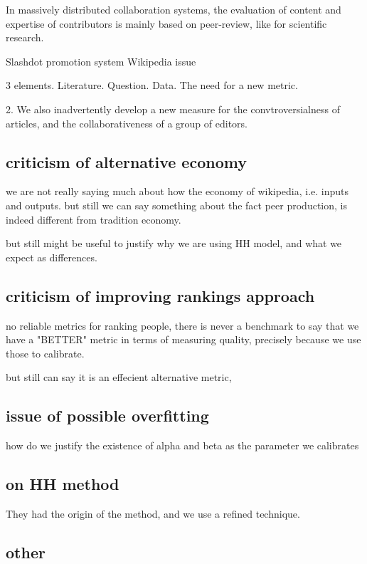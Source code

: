 \documentclass{acm_proc_article-sp}
\begin{document}
In massively distributed collaboration systems, the evaluation of content and expertise of contributors is mainly based on peer-review, like for scientific research.

Slashdot promotion system \cite{}
Wikipedia issue \cite{halfaker2013}



3 elements. Literature. Question. Data. The need for a new metric.

2. We also inadvertently develop a new measure for the convtroversialness of articles, and the collaborativeness of a group of editors.

\subsection{criticism of alternative economy}
we are not really saying much about how the economy of wikipedia, i.e. inputs and outputs.
but still we can say something about the fact peer production, is indeed different from tradition economy.

but still might be useful to justify why we are using HH model, and what we expect as differences. 


\subsection{criticism of improving rankings approach}
no reliable metrics for ranking people, there is never a benchmark to say that we have a "BETTER" metric in terms of measuring quality, precisely because we use those to calibrate.

but still can say it is an effecient alternative metric, 

\subsection{issue of possible overfitting}
how do we justify the existence of alpha and beta as the parameter we calibrates

\subsection{ on HH method}
They had the origin of the method, and we use a refined technique.

\subsection{other}
\end{document}
